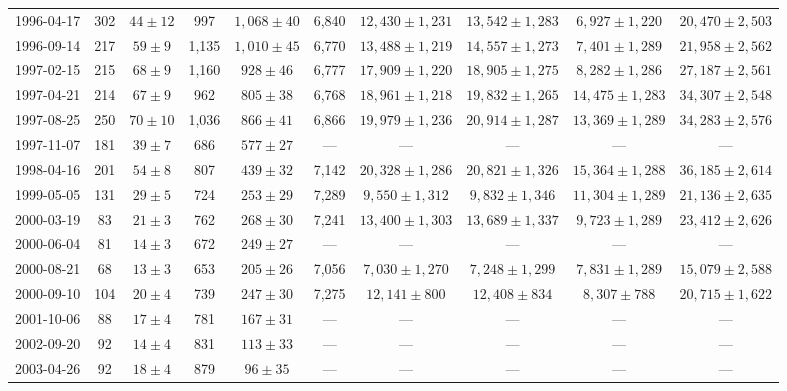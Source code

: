 \begin{landscape}
\begin{longtable}{cccccccccc}
{1996-04-17} & 302 & {$44  \pm  12$} & 997 & {$1,068 \pm 40$} & 6,840 & {$12,430 \pm 1,231$} & {$13,542 \pm 1,283$} & {$6,927 \pm 1,220$} & {$20,470 \pm 2,503$} \\
{1996-09-14} & 217 & {$59  \pm  9$} & 1,135 & {$1,010 \pm 45$} & 6,770 & {$13,488 \pm 1,219$} & {$14,557 \pm 1,273$} & {$7,401 \pm 1,289$} & {$21,958 \pm 2,562$} \\
{1997-02-15} & 215 & {$68  \pm  9$} & 1,160 & {$928 \pm 46$} & 6,777 & {$17,909 \pm 1,220$} & {$18,905 \pm 1,275$} & {$8,282 \pm 1,286$} & {$27,187 \pm 2,561$} \\
{1997-04-21} & 214 & {$67  \pm  9$} & 962 & {$805 \pm 38$} & 6,768 & {$18,961 \pm 1,218$} & {$19,832 \pm 1,265$} & {$14,475 \pm 1,283$} & {$34,307 \pm 2,548$} \\
{1997-08-25} & 250 & {$70  \pm  10$} & 1,036 & {$866 \pm 41$} & 6,866 & {$19,979 \pm 1,236$} & {$20,914 \pm 1,287$} & {$13,369 \pm 1,289$} & {$34,283 \pm 2,576$} \\
{1997-11-07} & 181 & {$39  \pm  7$} & 686 & {$577 \pm 27$} & --- & --- & --- & --- & --- \\
{1998-04-16} & 201 & {$54  \pm  8$} & 807 & {$439 \pm 32$} & 7,142 & {$20,328 \pm 1,286$} & {$20,821 \pm 1,326$} & {$15,364 \pm 1,288$} & {$36,185 \pm 2,614$} \\
{1999-05-05} & 131 & {$29  \pm  5$} & 724 & {$253 \pm 29$} & 7,289 & {$9,550 \pm 1,312$} & {$9,832 \pm 1,346$} & {$11,304 \pm 1,289$} & {$21,136 \pm 2,635$} \\
{2000-03-19} & 83 & {$21  \pm  3$} & 762 & {$268 \pm 30$} & 7,241 & {$13,400 \pm 1,303$} & {$13,689 \pm 1,337$} & {$9,723 \pm 1,289$} & {$23,412 \pm 2,626$} \\
{2000-06-04} & 81 & {$14  \pm  3$} & 672 & {$249 \pm 27$} & --- & --- & --- & --- & --- \\
{2000-08-21} & 68 & {$13  \pm  3$} & 653 & {$205 \pm 26$} & 7,056 & {$7,030 \pm 1,270$} & {$7,248 \pm 1,299$} & {$7,831 \pm 1,289$} & {$15,079 \pm 2,588$} \\
{2000-09-10} & 104 & {$20  \pm  4$} & 739 & {$247 \pm 30$} & 7,275 & {$12,141 \pm 800$} & {$12,408 \pm 834$} & {$8,307 \pm 788$} & {$20,715 \pm 1,622$} \\
{2001-10-06} & 88 & {$17  \pm  4$} & 781 & {$167 \pm 31$} & --- & --- & --- & --- & --- \\
{2002-09-20} & 92 & {$14  \pm  4$} & 831 & {$113 \pm 33$} & --- & --- & --- & --- & --- \\
{2003-04-26} & 92 & {$18  \pm  4$} & 879 & {$96 \pm 35$} & --- & --- & --- & --- & --- \\

\end{longtable}
\end{landscape}
